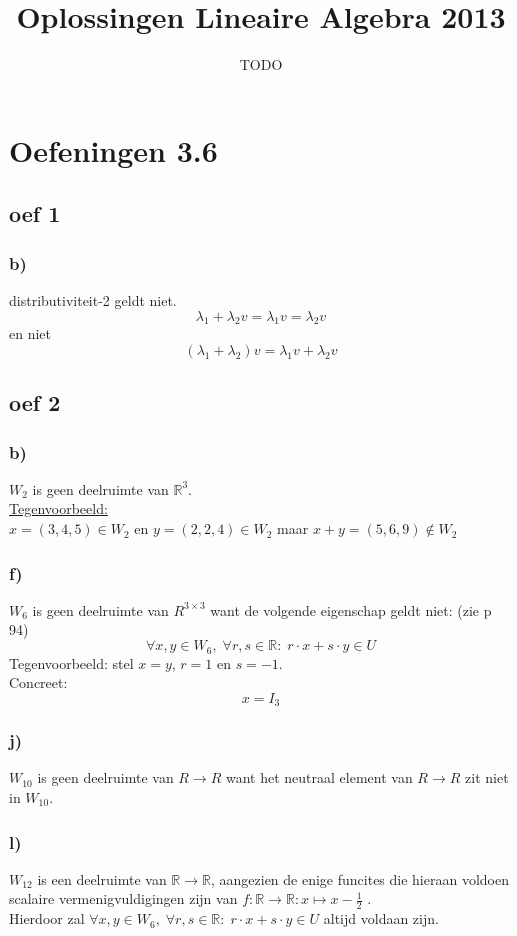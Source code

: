 \documentclass[10pt,a4paper]{article}
\title{Oplossingen Lineaire Algebra 2013}
\author{TODO}
\begin{document}
\maketitle
\pagebreak
\tableofcontents
\pagebreak
\section*{Oefeningen 3.6}

\subsection*{oef 1}
\subsubsection*{b)}
distributiviteit-2 geldt niet.
\[
\lambda_1 + \lambda_2v = \lambda_1v = \lambda_2v
\]
en niet
\[
(\lambda_1 + \lambda_2)v = \lambda_1v+\lambda_2v
\]

\subsection*{oef 2}
\subsubsection*{b)}
$W_2$ is geen deelruimte van $\mathbb{R}^{3}$.\\
\underline{Tegenvoorbeeld:}\\
$x = (3, 4, 5) \in W_2$ en $y = (2, 2, 4) \in W_2$ maar $x + y = (5, 6, 9) \not \in W_2$
\subsubsection*{f)}
$W_6$ is geen deelruimte van $R^{3\times 3}$ want de volgende eigenschap geldt niet: (zie p 94)
\[
\forall x,y\in W_6,\;\forall r,s\in\mathbb{R}:\; r\cdot x+s\cdot y\in U
\]
Tegenvoorbeeld:
stel $x=y$, $r=1$ en $s=-1$.\\
Concreet:
\[
x = I_3
\]
\subsubsection*{j)}
$W_{10}$ is geen deelruimte van $R\rightarrow R$ want het neutraal element van $R\rightarrow R$  zit niet in $W_{10}$.
\subsubsection*{l)}
$W_{12}$ is een deelruimte van $\mathbb{R} \rightarrow \mathbb{R}$, aangezien de enige funcites die hieraan voldoen scalaire vermenigvuldigingen zijn van $f: \mathbb{R} \rightarrow \mathbb{R}: x \mapsto x - \frac{1}{2}$ .\\
Hierdoor zal $\forall x,y\in W_6,\;\forall r,s\in\mathbb{R}:\; r\cdot x+s\cdot y\in U$ altijd voldaan zijn.
\end{document}
